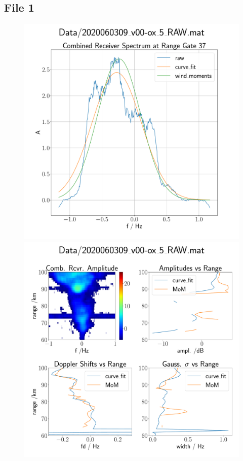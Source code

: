 \subsection{File 1}
\begin{figure}[H]
  \begin{minipage}[t]{0.45\textwidth}
    \centering
    \includegraphics[width=\textwidth]{graphics/data_0_single_rg.pdf}
    \caption{}
  \end{minipage}\hfill
  \begin{minipage}[t]{0.45\textwidth}
    \centering
    \includegraphics[width=\textwidth]{graphics/data_0_quad.pdf}
    \caption{}
   \end{minipage}
\end{figure}


